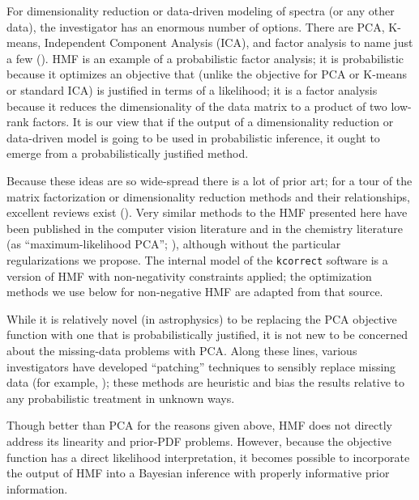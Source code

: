 \documentclass[12pt,preprint]{aastex}
\begin{document}
For dimensionality reduction or data-driven modeling of spectra (or
any other data), the investigator has an enormous number of options.
There are PCA, K-means, Independent Component Analysis (ICA), 
and factor analysis to name just a few (\citealt{rz}).
HMF is an example of a probabilistic factor analysis;
it is probabilistic because it optimizes an objective that
(unlike the objective for PCA or K-means or standard ICA) is
justified in terms of a likelihood; it is a factor analysis because it
reduces the dimensionality of the data matrix to a product of two
low-rank factors.  It is our view that if the output of a
dimensionality reduction or data-driven model is going to be used in
probabilistic inference, it ought to emerge from a probabilistically
justified method.

Because these ideas are so wide-spread there is a lot of prior art;
for a tour of the matrix factorization or dimensionality reduction
methods and their relationships, excellent reviews exist
(\citealt{rz}).
Very similar methods to the HMF presented here have been
published in the computer vision literature and in
the chemistry literature (as ``maximum-likelihood PCA'';
\citealt{mlpca}), although without the particular regularizations we
propose.  The internal model of the \texttt{kcorrect} software
\citep{blanton} is a version of HMF with non-negativity constraints
applied; the optimization methods we use below for non-negative HMF
are adapted from that source.

While it is relatively novel (in astrophysics) to be replacing the PCA
objective function with one that is probabilistically justified, it is
not new to be concerned about the missing-data problems with PCA.
Along these lines, various investigators have developed ``patching''
techniques to sensibly replace missing data (for example,
\citealt{eishogg, wild, budavarirobust}); these methods are
heuristic and bias the results relative to any probabilistic treatment
in unknown ways.

Though better than PCA for the reasons given above, HMF does not
directly address its linearity and prior-PDF problems.  However,
because the objective function has a direct likelihood interpretation,
it becomes possible to incorporate the output of HMF into a Bayesian
inference with properly informative prior information.
\end{document}
